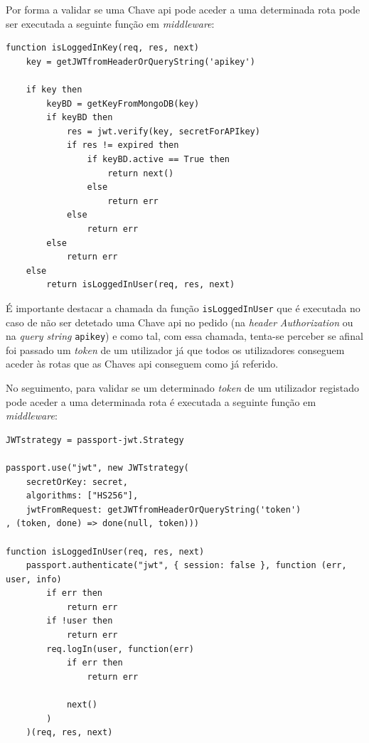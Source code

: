 Por forma a validar se uma Chave \acrshort{api} pode aceder a uma determinada rota pode ser executada a seguinte função em \textit{middleware}:
\begin{lstlisting}[language=pseudocode, caption=Verificação se um pedido com uma determinada Chave \acrshort{api} pode ser efetuado]
function isLoggedInKey(req, res, next)
    key = getJWTfromHeaderOrQueryString('apikey')

    if key then
        keyBD = getKeyFromMongoDB(key)
        if keyBD then
            res = jwt.verify(key, secretForAPIkey)
            if res != expired then
                if keyBD.active == True then
                    return next()
                else
                    return err
            else
                return err
        else
            return err
    else
        return isLoggedInUser(req, res, next)
\end{lstlisting}
É importante destacar a chamada da função \texttt{isLoggedInUser} que é executada no caso de não ser detetado uma Chave \acrshort{api} no pedido (na \textit{header} \textit{Authorization} ou na \textit{query string} \texttt{apikey}) e como tal, com essa chamada, tenta-se perceber se afinal foi passado um \textit{token} de um utilizador já que todos os utilizadores conseguem aceder às rotas que as Chaves \acrshort{api} conseguem como já referido.

No seguimento, para validar se um determinado \textit{token} de um utilizador registado pode aceder a uma determinada rota é executada a seguinte função em \textit{middleware}:
\begin{lstlisting}[language=pseudocode, caption=Verificação se um pedido com um determinado \textit{token} de um utilizador registado pode ser efetuado]
JWTstrategy = passport-jwt.Strategy

passport.use("jwt", new JWTstrategy(
    secretOrKey: secret,
    algorithms: ["HS256"],
    jwtFromRequest: getJWTfromHeaderOrQueryString('token')
, (token, done) => done(null, token)))

function isLoggedInUser(req, res, next)
    passport.authenticate("jwt", { session: false }, function (err, user, info)
        if err then
            return err
        if !user then
            return err
        req.logIn(user, function(err)
            if err then
                return err

            next()
        )
    )(req, res, next)
\end{lstlisting}

